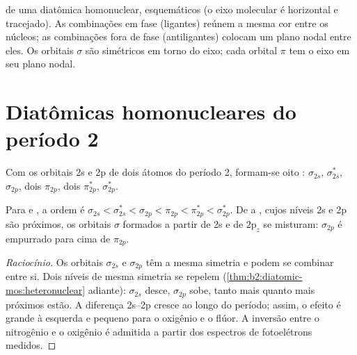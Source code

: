 \begin{omfigure}

{\small {} de uma diatômica homonuclear, esquemáticos (o eixo
molecular é horizontal e tracejado). As combinações em fase (ligantes) reúnem
a mesma cor entre os núcleos; as combinações fora de fase (antiligantes)
colocam um plano nodal entre eles. Os orbitais $\sigma$ são simétricos em
torno do eixo; cada orbital $\pi$ tem o eixo em seu plano nodal.}
\end{omfigure}

\section{Diatômicas homonucleares do período 2}

Com os orbitais 2s e 2p de dois átomos do período 2, formam-se oito : $\sigma_{2s}$, $\sigma^*_{2s}$, $\sigma_{2p}$, dois $\pi_{2p}$, dois $\pi^*_{2p}$,
$\sigma^*_{2p}$.

\begin{proposition}[Mistura s--p]\label{prop:b2:diatomic-mos:sp-mixing}
Para  e , a ordem é $\sigma_{2s} < \sigma^*_{2s} < \sigma_{2p} < \pi_{2p} <
\pi^*_{2p} < \sigma^*_{2p}$. De  a , cujos níveis 2s e 2p são próximos,
os orbitais $\sigma$ formados a partir de 2s e de $2\mathrm p_z$ se misturam:
$\sigma_{2p}$ é empurrado para cima de $\pi_{2p}$.
\end{proposition}

\begin{proof}[Raciocínio]
Os orbitais $\sigma_{2s}$ e $\sigma_{2p}$ têm a mesma simetria e podem se combinar
entre si. Dois níveis de mesma simetria se repelem (\cref{thm:b2:diatomic-mos:heteronuclear}
adiante): $\sigma_{2s}$ desce, $\sigma_{2p}$ sobe, tanto mais quanto mais próximos
estão. A diferença 2s--2p cresce ao longo do período; assim, o efeito é grande à
esquerda e pequeno para o oxigênio e o flúor. A inversão entre o nitrogênio e
o oxigênio é admitida a partir dos espectros de fotoelétrons medidos.
\end{proof}

